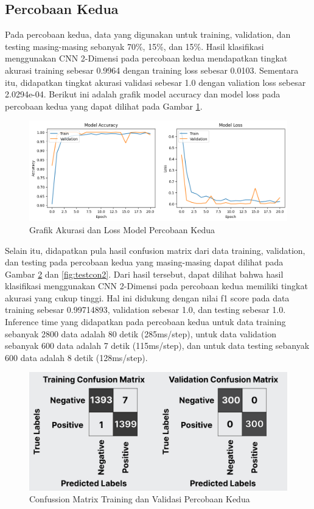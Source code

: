 \subsection{Percobaan Kedua}
Pada percobaan kedua, data yang digunakan untuk training, validation, dan testing masing-masing sebanyak 70\%, 15\%, dan 15\%. Hasil klasifikasi menggunakan CNN 2-Dimensi pada percobaan kedua mendapatkan tingkat akurasi training sebesar 0.9964 dengan training loss sebesar 0.0103. Sementara itu, didapatkan tingkat akurasi validasi sebesar 1.0 dengan valiation loss sebesar 2.0294e-04. Berikut ini adalah grafik model accuracy dan model loss pada percobaan kedua yang dapat dilihat pada Gambar \ref{fig:trainres2}.

\begin{figure} [H] \centering
    \includegraphics[scale=0.5]{gambar/bab4/trainres2.png}
    \caption{Grafik Akurasi dan Loss Model Percobaan Kedua}
    \label{fig:trainres2}
\end{figure}

Selain itu, didapatkan pula hasil confusion matrix dari data training, validation, dan testing pada percobaan kedua yang masing-masing dapat dilihat pada Gambar \ref{fig:tvcon2} dan \ref{fig:testcon2}. Dari hasil tersebut, dapat dilihat bahwa hasil klasifikasi menggunakan CNN 2-Dimensi pada percobaan kedua memiliki tingkat akurasi yang cukup tinggi. Hal ini didukung dengan nilai f1 score pada data training sebesar 0.99714893, validation sebesar 1.0, dan testing sebesar 1.0. Inference time yang didapatkan pada percobaan kedua untuk data training sebanyak 2800 data adalah 80 detik (285ms/step), untuk data validation sebanyak 600 data adalah 7 detik (115ms/step), dan untuk data testing sebanyak 600 data adalah 8 detik (128ms/step).

\begin{figure} [H] \centering
    \includegraphics[scale=0.3]{gambar/bab4/tvcon2.png}
    \caption{Confussion Matrix Training dan Validasi Percobaan Kedua}
    \label{fig:tvcon2}
\end{figure}

